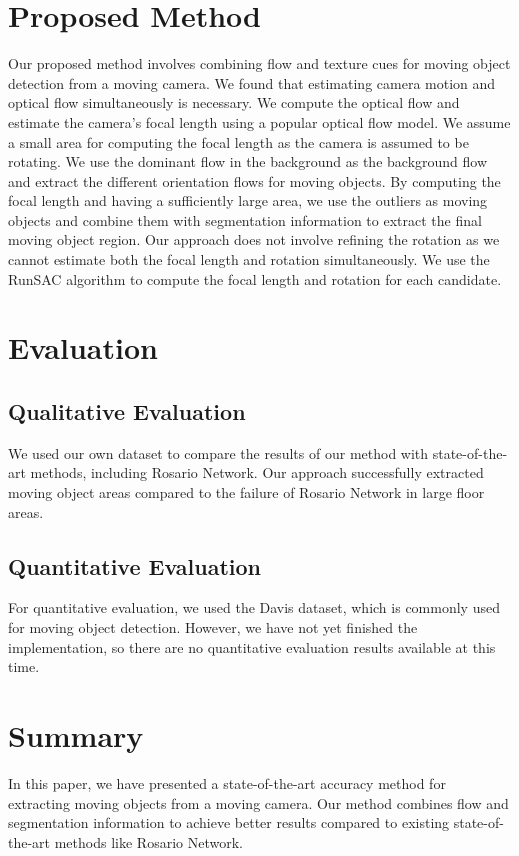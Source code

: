 \documentclass[10pt, twocolumn]{article}
\begin{document}
\section{Proposed Method}
Our proposed method involves combining flow and texture cues for moving object detection from a moving camera. We found that estimating camera motion and optical flow simultaneously is necessary. We compute the optical flow and estimate the camera's focal length using a popular optical flow model. We assume a small area for computing the focal length as the camera is assumed to be rotating. We use the dominant flow in the background as the background flow and extract the different orientation flows for moving objects. By computing the focal length and having a sufficiently large area, we use the outliers as moving objects and combine them with segmentation information to extract the final moving object region. Our approach does not involve refining the rotation as we cannot estimate both the focal length and rotation simultaneously. We use the RunSAC algorithm to compute the focal length and rotation for each candidate.

\section{Evaluation}

\subsection{Qualitative Evaluation}
We used our own dataset to compare the results of our method with state-of-the-art methods, including Rosario Network. Our approach successfully extracted moving object areas compared to the failure of Rosario Network in large floor areas.

\subsection{Quantitative Evaluation}
For quantitative evaluation, we used the Davis dataset, which is commonly used for moving object detection. However, we have not yet finished the implementation, so there are no quantitative evaluation results available at this time.

\section{Summary}
In this paper, we have presented a state-of-the-art accuracy method for extracting moving objects from a moving camera. Our method combines flow and segmentation information to achieve better results compared to existing state-of-the-art methods like Rosario Network.
\end{document}
